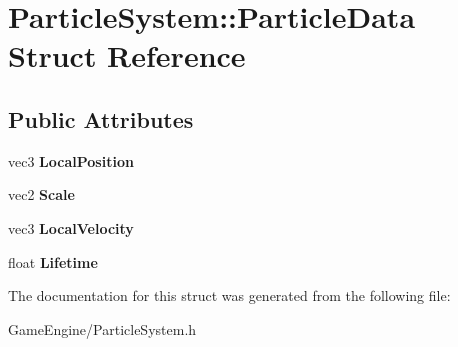 \section{Particle\+System\+::Particle\+Data Struct Reference}
\label{struct_particle_system_1_1_particle_data}
\subsection*{Public Attributes}
\begin{DoxyCompactItemize}
\item 
\mbox{\label{struct_particle_system_1_1_particle_data_a41b97525059b08304bcc41b3dfac5cb0}} 
vec3 {\bfseries Local\+Position}
\item 
\mbox{\label{struct_particle_system_1_1_particle_data_a00ec97acd6b0d996e9e63c3bca2b92dc}} 
vec2 {\bfseries Scale}
\item 
\mbox{\label{struct_particle_system_1_1_particle_data_aa1f670d511cff8e3baf319592e16ffc0}} 
vec3 {\bfseries Local\+Velocity}
\item 
\mbox{\label{struct_particle_system_1_1_particle_data_a17019ca9ba5b0411e3f450bad9dfa6bb}} 
float {\bfseries Lifetime}
\end{DoxyCompactItemize}


The documentation for this struct was generated from the following file\+:\begin{DoxyCompactItemize}
\item 
Game\+Engine/Particle\+System.\+h\end{DoxyCompactItemize}
